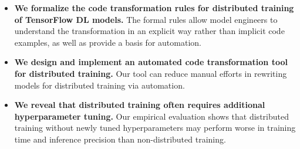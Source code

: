\begin{itemize}
  \item {\bf We formalize the code transformation rules for distributed
    training of TensorFlow DL models.} The formal rules allow model engineers
    to understand the transformation in an explicit way rather than implicit
    code examples, as well as provide a basis for automation. 

  \item {\bf We design and implement an automated code transformation tool for
    distributed training.} Our tool can reduce manual efforts in rewriting
    models for distributed training via automation.

  \item {\bf We reveal that distributed training often requires additional
    hyperparameter tuning.} 
    Our empirical evaluation shows that distributed training without newly
    tuned hyperparameters may perform worse in training time and inference
    precision than non-distributed training.
\end{itemize}
